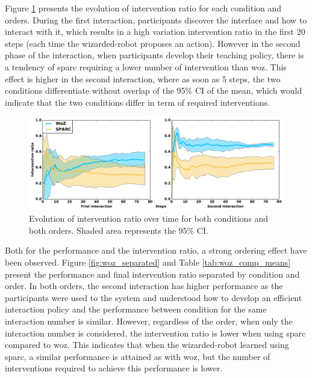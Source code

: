 Figure \ref{fig:woz_ratio_time} presents the evolution of intervention ratio for each condition and orders. During the first interaction, participants discover the interface and how to interact with it, which results in a high variation intervention ratio in the first 20 steps (each time the wizarded-robot proposes an action). However in the second phase of the interaction,  when participants develop their teaching policy, there is a tendency of \gls{sparc} requiring a lower number of intervention than \gls{woz}. This effect is higher in the second interaction, where as soon as 5 steps, the two conditions differentiate without overlap of the 95\% CI of the mean, which would indicate that the two conditions differ in term of required interventions.

\begin{figure}[ht]
	\centering
	\includegraphics[width=1.\textwidth]{ratio_time.pdf}
	\caption{Evolution of intervention ratio over time for both conditions and both orders. Shaded area represents the 95\% CI.}
	\label{fig:woz_ratio_time}
\end{figure}

Both for the performance and the intervention ratio, a strong ordering effect have been observed. Figure \ref{fig:woz_separated} and Table \ref{tab:woz_comp_means} present the performance and final intervention ratio separated by condition and order. In both orders, the second interaction has higher performance as the participants were used to the system and understood how to develop an efficient interaction policy and the performance between condition for the same interaction number is similar. However, regardless of the order, when only the interaction number is considered, the intervention ratio is lower when using \gls{sparc} compared to \gls{woz}. This indicates that when the wizarded-robot learned using \gls{sparc}, a similar performance is attained as with \gls{woz}, but the number of interventions required to achieve this performance is lower.


